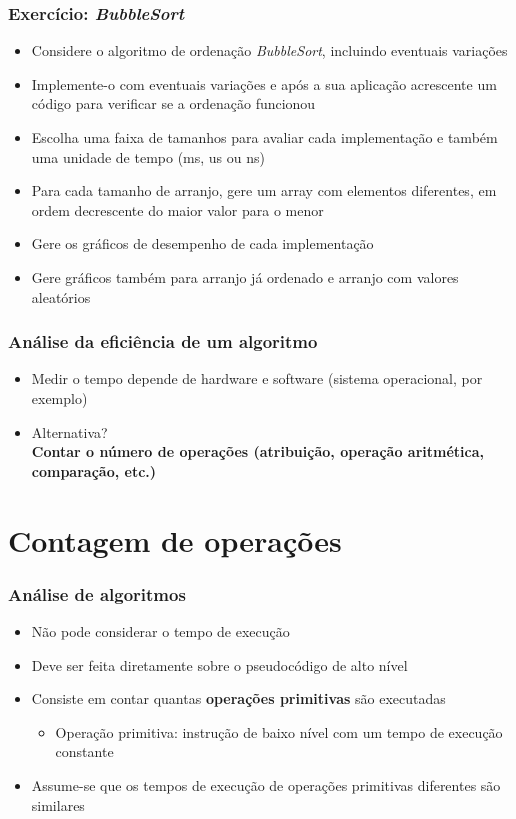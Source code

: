 \documentclass[aspectratio=169]{beamer}
\begin{document}
\begin{frame}[fragile]\frametitle{Exercício: \emph{BubbleSort}}
\begin{itemize}
	\item Considere o algoritmo de ordenação \emph{BubbleSort}, incluindo eventuais variações
	\item Implemente-o com eventuais variações e após a sua aplicação acrescente um código para verificar se a ordenação funcionou
	\item Escolha uma faixa de tamanhos para avaliar cada implementação e também uma unidade de tempo (ms, us ou ns)
	\item Para cada tamanho de arranjo, gere um array com elementos diferentes, em ordem decrescente do maior valor para o menor
	\item Gere os gráficos de desempenho de cada implementação
	\item Gere gráficos também para arranjo já ordenado e arranjo com valores aleatórios
\end{itemize}
\end{frame}

\begin{frame}\frametitle{Análise da eficiência de um algoritmo}
\begin{itemize}
	\item Medir o tempo depende de hardware e software (sistema operacional, por exemplo)
	\item Alternativa?\\
	\pause
	\textbf{Contar o número de operações (atribuição, operação aritmética, comparação, etc.)}
\end{itemize}
\end{frame}

\section{Contagem de operações}

\begin{frame}\frametitle{Análise de algoritmos}
\begin{itemize}
	\item Não pode considerar o tempo de execução
	\item Deve ser feita diretamente sobre o pseudocódigo de alto nível
	\item Consiste em contar quantas \textbf{operações primitivas} são executadas
	\begin{itemize}
		\item Operação primitiva: instrução de baixo nível com um tempo de execução constante
	\end{itemize}
	\item Assume-se que os tempos de execução de operações primitivas diferentes são similares
\end{itemize}
\end{frame}
\end{document}
